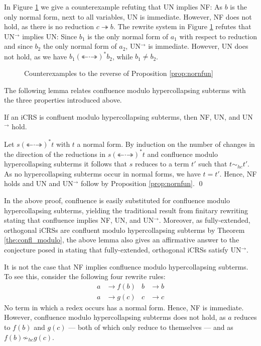 \documentclass{LMCS}
\theoremstyle{plain}
\theoremstyle{definition}
\newcommand{\rew}{\rightarrow}
\newcommand{\trewt}{\twoheadrightarrow}
\newcommand{\trewtb}{\twoheadleftarrow}
\newcommand{\trewtc}{\mathrel{(\mathord{\trewtb}\mathord{\cdot}\mathord{\trewt})^*}}
\newcommand{\simhc}{\sim_{hc}}
\begin{document}
In Figure \ref{fig:nornfun} we give a counterexample refuting that UN implies NF: As $b$ is the only normal form, next to all variables, UN is immediate. However, NF does not hold, as there is no reduction $c \trewt b$. The rewrite system in Figure \ref{fig:nornfun} refutes that UN$^\rew$ implies UN: Since $b_1$ is the only normal form of $a_1$ with respect to reduction and since $b_2$ the only normal form of $a_2$, UN$^\rew$ is immediate. However, UN does not hold, as we have $b_1 \trewtc b_2$, while $b_1 \not = b_2$.

\begin{figure}
\centering
{}
\qquad \qquad
{}
\caption{\label{fig:nornfun}Counterexamples to the reverse of Proposition \ref{prop:nornfun}}
\end{figure}

The following lemma relates confluence modulo hypercollapsing subterms with the three properties introduced above.
\begin{lem}
\label{lem:UNR}
If an iCRS is confluent modulo hypercollapsing subterms, then NF, UN, and UN$^\rew$ hold.
\end{lem}

\proof
Let $s \trewtc t$ with $t$ a normal form. By induction on the number of changes in the direction of the reductions in $s \trewtc t$ and confluence modulo hypercollapsing subterms it follows that $s$ reduces to a term $t'$ such that $t \simhc t'$. As no hypercollapsing subterms occur in normal forms, we have $t = t'$. Hence, NF holds and UN and UN$^\rew$ follow by Proposition \ref{prop:nornfun}. \qed

In the above proof, confluence is easily substituted for confluence modulo hypercollapsing subterms, yielding the traditional result from finitary rewriting stating that confluence implies NF, UN, and UN$^\rew$. Moreover, as fully-extended, orthogonal iCRSs are confluent modulo hypercollapsing subterms by Theorem \ref{the:confl_modulo}, the above lemma also gives an affirmative answer to the conjecture posed in \cite{KV05} stating that fully-extended, orthogonal iCRSs satisfy UN$^\rew$.

It is not the case that NF implies confluence modulo hypercollapsing subterms. To see this, consider the following four rewrite rules:
\begin{align*}
a & \rew f(b) & b & \rew b\\
a & \rew g(c) & c & \rew c
\end{align*}
\noindent No term in which a redex occurs has a normal form. Hence, NF is immediate. However, confluence modulo hypercollapsing subterms does not hold, as $a$ reduces to $f(b)$ and $g(c)$ --- both of which only reduce to themselves --- and as $f(b) \not \simhc g(c)$.
\end{document}
